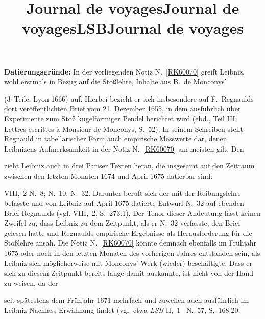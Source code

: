 \begin{ledgroup}
\footnotesize
\pstart
\noindent%
\textbf{Datierungsgründe:}
In der vorliegenden Notiz N.~\ref{RK60070} %
greift Leibniz, wohl erstmals in Bezug auf die Stoßlehre, Inhalte aus B.~de Monconys'%
\protect{}
\title{Journal de voyages} (3~Teile, Lyon 1666)\cite{00118} auf.
Hierbei bezieht er sich insbesondere auf F.~Regnaulds%
\protect{}
dort veröffentlichten Brief vom 21. Dezember 1655, in dem ausführlich über Experimente zum Stoß kugelförmiger Pendel berichtet wird (ebd., Teil III: \glqq Lettres escrittes à Monsieur de Monconys\grqq, S.~52).\cite{02021} %
In seinem Schreiben stellt Regnauld in tabellarischer Form auch empirische Messwerte dar, denen Leibnizens Aufmerksamkeit in der Notiz N.~\ref{RK60070} %
am meisten gilt.
\pend%
%
\pstart%
Den \title{Journal de voyages}\cite{00118} zieht Leibniz auch in drei Pariser Texten heran, die insgesamt auf den Zeitraum zwischen den letzten Monaten 1674 und April 1675 datierbar sind:
\title{LSB} VIII,~2 N.~8;\cite{01343} N.~10;\cite{01344} N.~32.\cite{01345}
Darunter beruft sich der mit der Reibungslehre befasste und von Leibniz auf April 1675 datierte Entwurf N.~32 auf ebenden %
Brief Regnaulds%
\protect{} (vgl. VIII,~2, S.~273.1).\cite{01345}
Der Tenor dieser Andeutung lässt keinen Zweifel zu, dass Leibniz zu dem Zeitpunkt, als er N.~32 verfasste, den Brief gelesen hatte und Regnaulds empirische Ergebnisse als Herausforderung für die Stoßlehre ansah. %
Die Notiz N.~\ref{RK60070} %
könnte demnach ebenfalls im Frühjahr 1675 oder noch in den letzten Monaten des vorherigen Jahres entstanden sein, als Leibniz sich möglicherweise mit Monconys' Werk (wieder) beschäftigte.
Dass er sich zu diesem Zeitpunkt bereits lange damit auskannte, ist nicht von der Hand zu weisen, da der \title{Journal de voyages}\cite{00118} seit spätestens dem Frühjahr 1671 mehrfach und zuweilen auch ausführlich im Leibniz-Nachlass Erwähnung findet (vgl. etwa
\textit{LSB} II,~1 \rbrack\ N.~57, S.~168.20;\cite{01346} %

\end{ledgroup}
